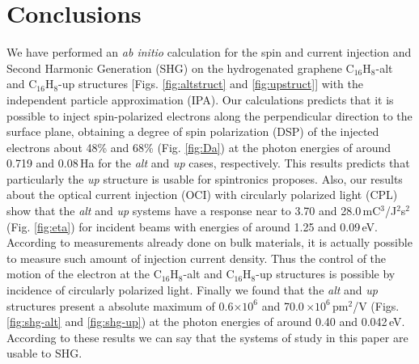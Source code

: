 \documentclass[aps,pra,11pt,tightenlines,showpacs,superscriptaddress,groupedaddress]{revtex4-1}
\newcommand{\altstc}{C$_{16}$H$_{8}$-alt}
\newcommand{\upstc}{C$_{16}$H$_{8}$-up}
\begin{document}

\section{Conclusions} %
\label{sec:conclusions}

We have performed an \emph{ab initio} calculation for the spin and current injection and
Second Harmonic Generation (SHG) on the hydrogenated graphene {\altstc} and
{\upstc} structures [Figs. \ref{fig:altstruct} and \ref{fig:upstruct}] with the
independent particle approximation (IPA). Our calculations predicts that it is
possible to inject spin-polarized electrons along the perpendicular direction
to the surface plane, obtaining a degree of spin polarization (DSP) of the
injected electrons about 48\% and 68\%  (Fig. \ref{fig:Da}) at the photon energies of around 0.719
and 0.08\,Ha  for the \emph{alt} and \emph{up} cases, respectively. This results predicts that particularly
the \emph{up} structure is usable for spintronics proposes. Also, our results
about the optical current injection (OCI) with circularly polarized light (CPL)
show that the \emph{alt}  and \emph{up} systems have a response near to 3.70
and 28.0\,mC$^{3}$/J$^{2}$s$^{2}$ (Fig. \ref{fig:eta}) for incident beams with energies of around
1.25 and 0.09\,eV. According to measurements already done on bulk materials, it
is actually possible to measure such amount of injection current density. Thus 
the control of the motion of the electron at the
{\altstc} and {\upstc} structures is possible by incidence of circularly
polarized light. Finally we found that the \emph{alt} and \emph{up} structures
present a absolute maximum of 0.6$\times 10^{6}$ and 70.0\,$\times 10^{6}
$\,pm$^{2}$/V (Figs. \ref{fig:shg-alt} and \ref{fig:shg-up}) at the photon energies of around 0.40 and 0.042\,eV.
According to these results we can say that the systems of study in this paper are
usable to SHG.



\end{document}
